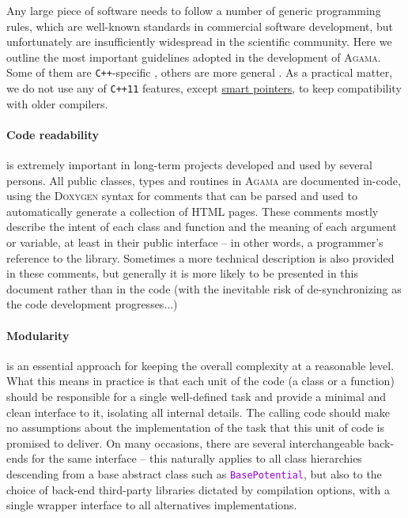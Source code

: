 \documentclass[12pt]{article}
\newcommand{\Agama}{\textsc{Agama}\xspace}
\newcommand{\Cpp}  {\texttt{C++}\xspace}
\newcommand{\CppII}{\texttt{C++11}\xspace}
\newcommand{\ttt}[1]{\textcolor{darkviolet}{\texttt{#1}}}
\begin{document}
Any large piece of software needs to follow a number of generic programming rules, which are well-known standards in commercial software development, but unfortunately are insufficiently widespread in the scientific community. Here we outline the most important guidelines adopted in the development of \Agama. Some of them are \Cpp-specific \cite{Meyers,SutterAlexandrescu}, others are more general \cite{Martin,McConnell}.
As a practical matter, we do not use any of \CppII features, except \hyperref[sec:SmartPointers]{smart pointers}, to keep compatibility with older compilers.

\paragraph{Code readability} is extremely important in long-term projects developed and used by several persons. All public classes, types and routines in \Agama are documented in-code, using the \textsc{Doxygen} syntax for comments that can be parsed and used to automatically generate a collection of HTML pages. These comments mostly describe the intent of each class and function and the meaning of each argument or variable, at least in their public interface -- in other words, a programmer's reference to the library. Sometimes a more technical description is also provided in these comments, but generally it is more likely to be presented in this document rather than in the code (with the inevitable risk of de-synchronizing as the code development progresses...)

\paragraph{Modularity} is an essential approach for keeping the overall complexity at a reasonable level. What this means in practice is that each unit of the code (a class or a function) should be responsible for a single well-defined task and provide a minimal and clean interface to it, isolating all internal details. The calling code should make no assumptions about the implementation of the task that this unit of code is promised to deliver. On many occasions, there are several interchangeable back-ends for the same interface -- this naturally applies to all class hierarchies descending from a base abstract class such as \ttt{BasePotential}, but also to the choice of back-end third-party libraries dictated by compilation options, with a single wrapper interface to all alternatives implementations.
\end{document}
